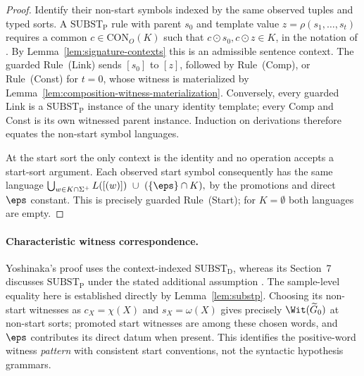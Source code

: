 \begin{proof}
Identify their non-start symbols indexed
by the same observed tuples and typed sorts.
A $\mathrm{SUBST}_{\mathrm P}$ rule
with parent $s_0$ and template value
$z=\rho(s_1,\ldots,s_t)$ requires a
common $c\in\mathrm{CON}_O(K)$ such that
$c\odot s_0,c\odot z\in K$,
in the notation of
\cite{Yoshinaka2015General}. By Lemma~\ref{lem:signature-contexts}
this is an admissible sentence context.
The guarded Rule~(Link) sends $[s_0]$
to $[z]$, followed by Rule~(Comp), or
Rule~(Const) for $t=0$, whose witness
is materialized by
Lemma~\ref{lem:composition-witness-materialization}.
Conversely, every guarded Link is a
$\mathrm{SUBST}_{\mathrm P}$ instance of
the unary identity template; every Comp
and Const is its own witnessed parent
instance. Induction on derivations
therefore equates the non-start
symbol languages.

At the start sort the only context is
the identity and no operation accepts
a start-sort argument. Each observed
start symbol consequently has the
same language
\(\bigcup_{w\in K\cap\Sigma^+}L([(w)]) \ \cup\ (\{\eps\}\cap K),\)
by the promotions and direct $\eps$
constant. This is precisely guarded
Rule~(Start); for $K=\emptyset$ both
languages are empty.
\end{proof}

\paragraph{Characteristic witness correspondence.}
Yoshinaka's proof uses the context-indexed
$\mathrm{SUBST}_{\mathrm D}$, whereas its
Section~7 discusses $\mathrm{SUBST}_{\mathrm P}$
under the stated additional assumption
\cite{Yoshinaka2015General}.
The sample-level equality here is established
directly by Lemma~\ref{lem:substp}.
Choosing its non-start witnesses as
$c_X=\chi(X)$ and $s_X=\omega(X)$
gives precisely $\Wit(\widetilde G_0)$
at non-start sorts; promoted start
witnesses are among these chosen words,
and $\eps$ contributes its direct
datum when present. This identifies
the positive-word witness \emph{pattern}
with consistent start conventions,
not the syntactic hypothesis grammars.

